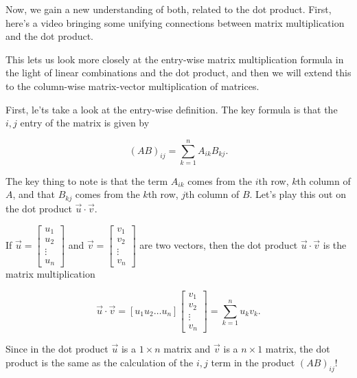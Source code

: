 \documentclass{ximera}
\begin{document}
Now, we gain a new understanding of both, related to the dot product. First, here's a video bringing some unifying connections between matrix multiplication and the dot product.

\begin{center}
\end{center}


This lets us look more closely at the entry-wise matrix multiplication formula in the light of linear combinations and the dot product, and then we will extend this to the column-wise matrix-vector multiplication of matrices.

First, le'ts take a look at the entry-wise definition. The key formula is that the $i,j$ entry of the matrix is given by 

$$(AB)_{ij}=\sum_{k=1}^n A_{ik}B_{kj}.$$

The key thing to note is that the term $A_{ik}$ comes from the $i$th row, $k$th column of $A$, and that $B_{kj}$ comes from the $k$th row, $j$th column of $B$. Let's play this out on the dot product $\vec{u}\cdot\vec{v}$.

\begin{example}
   If $\vec{u}=\begin{bmatrix}
      u_1\\u_2\\\vdots\\u_n
   \end{bmatrix}$ and $\vec{v}=\begin{bmatrix}
      v_1\\v_2\\\vdots\\v_n
   \end{bmatrix}$ are two vectors, then the dot product $\vec{u}\cdot\vec{v}$ is the matrix multiplication

   $$\vec{u}\cdot\vec{v}=\left[u_1 u_2 \ldots u_n\right]\begin{bmatrix}
      v_1 \\ v_2 \\ \vdots \\ v_n
   \end{bmatrix}=\sum_{k=1}^nu_kv_k.$$


\end{example}

Since in the dot product $\vec{u}$ is a $1\times n$ matrix and $\vec{v}$ is a $n\times 1$ matrix, the dot product is the same as the calculation of the $i,j$ term in the product $(AB)_{ij}$!
\end{document}
